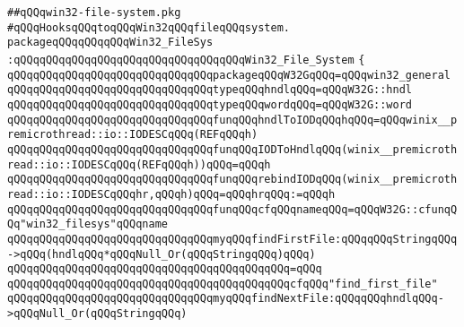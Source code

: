 \label{src/lib/std/src/win32/win32-file-system.pkg}
\verb|##qQQqwin32-file-system.pkg|\newline
\newline
\newline
\newline
\verb|#qQQqHooksqQQqtoqQQqWin32qQQqfileqQQqsystem.|\newline
\newline
\newline
\newline
\verb|packageqQQqqQQqqQQqWin32_FileSys|\newline
\verb|:qQQqqQQqqQQqqQQqqQQqqQQqqQQqqQQqqQQqWin32_File_System|\newline
\verb|{|\newline
\newline
\verb|qQQqqQQqqQQqqQQqqQQqqQQqqQQqqQQqpackageqQQqW32GqQQq=qQQqwin32_general|\newline
\verb|qQQqqQQqqQQqqQQqqQQqqQQqqQQqqQQqtypeqQQqhndlqQQq=qQQqW32G::hndl|\newline
\newline
\verb|qQQqqQQqqQQqqQQqqQQqqQQqqQQqqQQqtypeqQQqwordqQQq=qQQqW32G::word|\newline
\newline
\verb|qQQqqQQqqQQqqQQqqQQqqQQqqQQqqQQqfunqQQqhndlToIODqQQqhqQQq=qQQqwinix__premicrothread::io::IODESCqQQq(REFqQQqh)|\newline
\verb|qQQqqQQqqQQqqQQqqQQqqQQqqQQqqQQqfunqQQqIODToHndlqQQq(winix__premicrothread::io::IODESCqQQq(REFqQQqh))qQQq=qQQqh|\newline
\newline
\verb|qQQqqQQqqQQqqQQqqQQqqQQqqQQqqQQqfunqQQqrebindIODqQQq(winix__premicrothread::io::IODESCqQQqhr,qQQqh)qQQq=qQQqhrqQQq:=qQQqh|\newline
\newline
\verb|qQQqqQQqqQQqqQQqqQQqqQQqqQQqqQQqfunqQQqcfqQQqnameqQQq=qQQqW32G::cfunqQQq"win32_filesys"qQQqname|\newline
\newline
\verb|qQQqqQQqqQQqqQQqqQQqqQQqqQQqqQQqmyqQQqfindFirstFile:qQQqqQQqStringqQQq->qQQq(hndlqQQq*qQQqNull_Or(qQQqStringqQQq)qQQq)|\newline
\verb|qQQqqQQqqQQqqQQqqQQqqQQqqQQqqQQqqQQqqQQqqQQq=qQQq|\newline
\verb|qQQqqQQqqQQqqQQqqQQqqQQqqQQqqQQqqQQqqQQqqQQqcfqQQq"find_first_file"|\newline
\newline
\verb|qQQqqQQqqQQqqQQqqQQqqQQqqQQqqQQqmyqQQqfindNextFile:qQQqqQQqhndlqQQq->qQQqNull_Or(qQQqStringqQQq)|\newline
